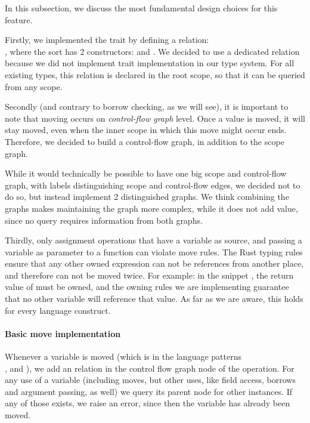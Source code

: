 In this subsection, we discuss the most fundamental design choices for this feature.

Firstly, we implemented the  trait by defining a relation:\ \\, where the sort  has 2 constructors:  and . We decided to use a dedicated relation because we did not implement trait implementation in our type system. For all existing types, this relation is declared in the root scope, so that it can be queried from any scope.

Secondly (and contrary to borrow checking, as we will see), it is important to note that moving occurs on \textit{control-flow graph} level. Once a value is moved, it will stay moved, even when the inner scope in which this move might occur ends. Therefore, we decided to build a control-flow graph, in addition to the scope graph.

While it would technically be possible to have one big scope and control-flow graph, with labels distinguishing scope and control-flow edges, we decided not to do so, but instead implement 2 distinguished graphs. We think combining the graphs makes maintaining the graph more complex, while it does not add value, since no query requires information from both graphs.

Thirdly, only assignment operations that have a variable as source, and passing a variable as parameter to a function can violate move rules. The Rust typing rules ensure that any other owned expression can not be references from another place, and therefore can not be moved twice. For example: in the snippet , the return value of  must be owned, and the owning rules we are implementing guarantee that no other variable will reference that value. As far as we are aware, this holds for every language construct. 

\paragraph{Basic move implementation}

Whenever a variable is moved (which is in the language patterns \\ ,  and ), we add an relation  in the control flow graph node of the operation. For any use of a variable (including moves, but other uses, like field access, borrows and argument passing, as well) we query its parent node for other  instances. If any of those exists, we raise an error, since then the variable has already been moved.

